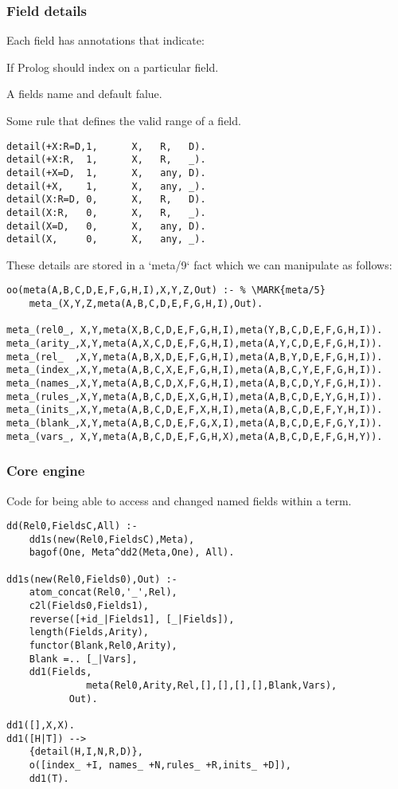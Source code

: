 \documentclass[twocolumn,10pt]{book}
\begin{document}
\subsubsection{ Field details
}
 Each field has annotations that indicate:
\be
\item If Prolog should index on a particular field.
\item A fields name and default falue.
\item Some rule that defines the
valid range of a field.
\ee  \begin{Verbatim}
detail(+X:R=D,1,      X,   R,   D).
detail(+X:R,  1,      X,   R,   _).
detail(+X=D,  1,      X,   any, D).
detail(+X,    1,      X,   any, _).
detail(X:R=D, 0,      X,   R,   D).
detail(X:R,   0,      X,   R,   _).
detail(X=D,   0,      X,   any, D).
detail(X,     0,      X,   any, _).
\end{Verbatim}
These details are stored in a `meta/9` fact which we
can manipulate as follows:   \begin{Verbatim}
oo(meta(A,B,C,D,E,F,G,H,I),X,Y,Z,Out) :- % \MARK{meta/5}
    meta_(X,Y,Z,meta(A,B,C,D,E,F,G,H,I),Out).

meta_(rel0_, X,Y,meta(X,B,C,D,E,F,G,H,I),meta(Y,B,C,D,E,F,G,H,I)).
meta_(arity_,X,Y,meta(A,X,C,D,E,F,G,H,I),meta(A,Y,C,D,E,F,G,H,I)).
meta_(rel_  ,X,Y,meta(A,B,X,D,E,F,G,H,I),meta(A,B,Y,D,E,F,G,H,I)).
meta_(index_,X,Y,meta(A,B,C,X,E,F,G,H,I),meta(A,B,C,Y,E,F,G,H,I)).
meta_(names_,X,Y,meta(A,B,C,D,X,F,G,H,I),meta(A,B,C,D,Y,F,G,H,I)).
meta_(rules_,X,Y,meta(A,B,C,D,E,X,G,H,I),meta(A,B,C,D,E,Y,G,H,I)).
meta_(inits_,X,Y,meta(A,B,C,D,E,F,X,H,I),meta(A,B,C,D,E,F,Y,H,I)).
meta_(blank_,X,Y,meta(A,B,C,D,E,F,G,X,I),meta(A,B,C,D,E,F,G,Y,I)).
meta_(vars_, X,Y,meta(A,B,C,D,E,F,G,H,X),meta(A,B,C,D,E,F,G,H,Y)).
\end{Verbatim}
\subsubsection{ Core engine
}
 Code for being able to  access and changed
named fields within a term.  \begin{Verbatim}
dd(Rel0,FieldsC,All) :-
    dd1s(new(Rel0,FieldsC),Meta),
    bagof(One, Meta^dd2(Meta,One), All).

dd1s(new(Rel0,Fields0),Out) :-
    atom_concat(Rel0,'_',Rel),
    c2l(Fields0,Fields1),
    reverse([+id_|Fields1], [_|Fields]),
    length(Fields,Arity),
    functor(Blank,Rel0,Arity),
    Blank =.. [_|Vars],
    dd1(Fields,
              meta(Rel0,Arity,Rel,[],[],[],[],Blank,Vars),
           Out).

dd1([],X,X).
dd1([H|T]) -->
    {detail(H,I,N,R,D)},
    o([index_ +I, names_ +N,rules_ +R,inits_ +D]),
    dd1(T).
\end{Verbatim}
\end{document}

